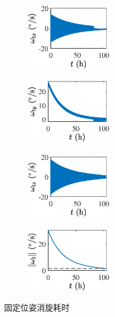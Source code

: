 \documentclass[lang=chs, degree=master, blindreview=false, winfonts=true]{yanputhesis}
\begin{document}
\begin{figure}[htb!]
	\centering
	\begin{minipage}[t]{0.96\textwidth}
		\centering
		\begin{subfigure}[t]{0.23\textwidth}
			\centering
			\includegraphics[width = 1.475in]{picture/fix_omega_x.eps}
			\caption{ }
			\label{fig:fixdetumb_time(a)}
		\end{subfigure}\hfill
		\begin{subfigure}[t]{0.23\textwidth}
			\centering
			\includegraphics[width = 1.475in]{picture/fix_omega_y.eps}
			\caption{ }
			\label{fig:fixdetumb_time(c)}
		\end{subfigure}\hfill
		\begin{subfigure}[t]{0.23\textwidth}
			\centering
			\includegraphics[width = 1.475in]{picture/fix_omega_z.eps}
			\caption{ }
			\label{fig:fixdetumb_time(e)}
		\end{subfigure}\hfill
		\begin{subfigure}[t]{0.23\textwidth}
			\centering
			\includegraphics[width = 1.475in]{picture/fix_omega_norm.eps}
			\caption{ }
			\label{fig:fixdetumb_time(g)}
		\end{subfigure}
	\end{minipage}
	\caption{固定位姿消旋耗时\label{Fig.fixdetumb_time}}
\end{figure}
\end{document}
